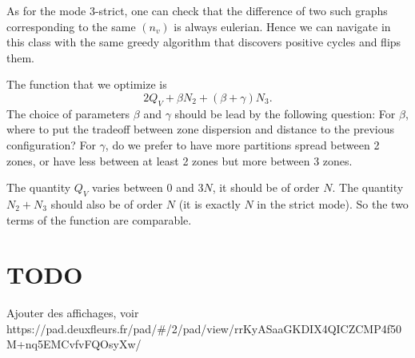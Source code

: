 \documentclass[]{article}
\begin{document}
As for the mode 3-strict, one can check that the difference of two such graphs corresponding to the same $(n_v)$ is always eulerian. Hence we can navigate in this class with the same greedy algorithm that discovers positive cycles and flips them.

The function that we optimize is 
$$
2Q_V +  \beta N_2 + (\beta+\gamma) N_3.
$$
The choice of parameters $\beta$ and $\gamma$ should be lead by the following question: For $\beta$, where to put the tradeoff between zone dispersion and distance to the previous configuration? For $\gamma$, do we prefer to have more partitions spread between 2 zones, or have less between at least 2 zones but more between 3 zones.

The quantity $Q_V$ varies between $0$ and $3N$, it should be of order $N$. The quantity $N_2+N_3$ should also be of order $N$ (it is exactly $N$ in the strict mode). So the two terms of the function are comparable. 

\section{TODO}

Ajouter des affichages, voir https://pad.deuxfleurs.fr/pad/#/2/pad/view/rrKyASaaGKDIX4QICZCMP4f50M+nq5EMCvfvFQOsyXw/
\end{document}
